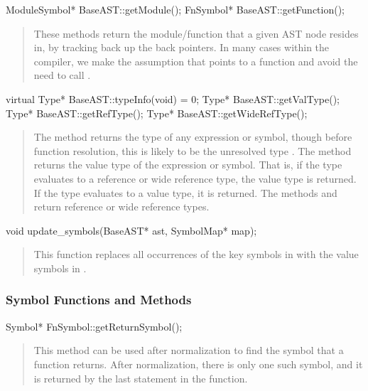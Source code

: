\documentclass[10pt]{article}
\begin{document}
\begin{clang}
ModuleSymbol* BaseAST::getModule();
FnSymbol* BaseAST::getFunction();
\end{clang}
\begin{quote}
These methods return the module/function that a given AST node resides
in, by tracking back up the back pointers.  In many cases within the
compiler, we make the assumption that  points to a
function and avoid the need to call .
\end{quote}

\begin{clang}
virtual Type* BaseAST::typeInfo(void) = 0;
Type* BaseAST::getValType();
Type* BaseAST::getRefType();
Type* BaseAST::getWideRefType();
\end{clang}
\begin{quote}
The method  returns the type of any expression or symbol,
  though before function resolution, this is likely to be the
  unresolved type .  The method  returns
  the value type of the expression or symbol.  That is, if the type
  evaluates to a reference or wide reference type, the value type is
  returned.  If the type evaluates to a value type, it is returned.
  The methods  and  return reference
  or wide reference types.
\end{quote}

\begin{clang}
void update_symbols(BaseAST* ast, SymbolMap* map);
\end{clang}
\begin{quote}
This function replaces all occurrences of the key symbols in 
with the value symbols in .
\end{quote}

\subsubsection{Symbol Functions and Methods}

\begin{clang}
Symbol* FnSymbol::getReturnSymbol();
\end{clang}
\begin{quote}
This method can be used after normalization to find the symbol that a
function returns.  After normalization, there is only one such symbol,
and it is returned by the last statement in the function.
\end{quote}
\end{document}
